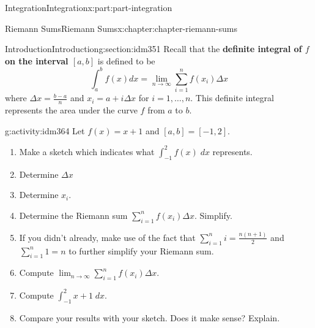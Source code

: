 \documentclass[oneside,10pt,]{book}
\newcommand{\terminology}[1]{\textbf{#1}}
\numberwithin{equation}{section}
\begin{document}
\begin{partptx}{Integration}{}{Integration}{}{}{x:part:part-integration}
%
\typeout{************************************************}
\typeout{************************************************}
%
\begin{chapterptx}{Riemann Sums}{}{Riemann Sums}{}{}{x:chapter:chapter-riemann-sums}
%
%
\typeout{************************************************}
\typeout{************************************************}
%
\begin{sectionptx}{Introduction}{}{Introduction}{}{}{g:section:idm351}
Recall that the \terminology{definite integral of \(f\) on the interval \([a,b]\)} is defined to be%
\begin{equation*}
\int_a^b f(x) dx = \lim_{n \to \infty} \sum_{i=1}^n f(x_i)\Delta x
\end{equation*}
where \(\displaystyle \Delta x = \frac{b-a}{n}\) and \(x_i = a + i \Delta x\) for \(i = 1, \dots, n\). This definite integral represents the area under the curve \(f\) from \(a\) to \(b\).%
\begin{activity}{}{g:activity:idm364}%
Let \(f(x) = x+1\) and \([a,b] = [-1,2]\).%
\begin{enumerate}[font=\bfseries,label=(\alph*),ref=\alph*]
\item{}Make a sketch which indicates what \(\displaystyle\int_{-1}^2 f(x) \; dx\) represents.\item{}Determine \(\Delta x\)%
\item{}Determine \(x_i\).%
\item{}Determine the Riemann sum \(\displaystyle\sum_{i=1}^n f(x_i) \Delta x\). Simplify.%
\item{}If you didn't already, make use of the fact that \(\displaystyle \sum_{i=1}^n i = \frac{n(n+1)}{2}\) and \(\displaystyle \sum_{i=1}^n 1 = n\) to further simplify your Riemann sum.%
\item{}Compute \(\displaystyle\lim_{n \to \infty} \sum_{i=1}^n f(x_i) \Delta x\).%
\item{}Compute \(\displaystyle\int_{-1}^2 x+1 \; dx\).%
\item{}Compare your results with your sketch. Does it make sense? Explain.%
\end{enumerate}
\end{activity}
\end{sectionptx}
%
%
\typeout{************************************************}
\typeout{************************************************}

\end{chapterptx}
\end{partptx}
\end{document}
